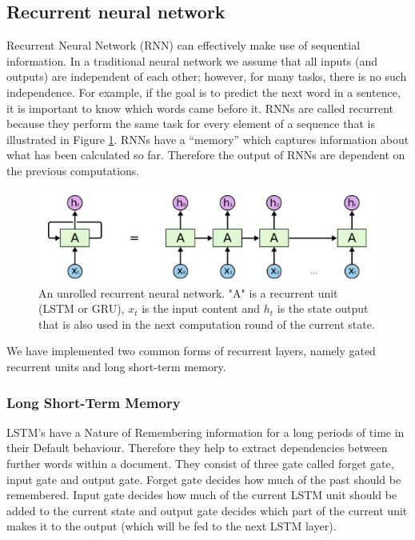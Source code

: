 \documentclass[8pt,conference,compsocconf]{IEEEtran}
\begin{document}
\subsection{Recurrent neural network}\label{sec:RNN}
Recurrent Neural Network (RNN) can effectively make use of sequential information. In a traditional neural network we assume that all inputs (and outputs) are independent of each other; however, for many tasks, there is no such independence. For example, if the goal is to predict the next word in a sentence, it is important to know which words came before it. RNNs are called recurrent because they perform the same task for every element of a sequence that is illustrated in Figure \ref{fig:rnn}. RNNs have a “memory” which captures information about what has been calculated so far. Therefore the output of RNNs are dependent on the previous computations.
	\begin{figure}[t]
	\centering
	\includegraphics[width=0.9 \linewidth]{fig/rnn.png}
	\caption{An unrolled recurrent neural network. "A" is a recurrent unit (LSTM or GRU), $x_t$ is the input content and $h_t$ is the state output that is also used in the next computation round of the current state.}
	\label{fig:rnn}
\end{figure}

We have implemented two common forms of recurrent layers, namely gated recurrent units and long short-term memory.
\subsubsection{Long Short-Term Memory}
LSTM’s have a Nature of Remembering information for a long periods of time in their Default behaviour. Therefore they help to extract dependencies between further words within a document. They consist of three gate called forget gate, input gate and output gate. Forget gate decides how much of the past should be remembered. Input gate decides how much of the current LSTM unit should be added to the current state and output gate decides which part of the current unit makes it to the output (which will be fed to the next LSTM layer). 
\end{document}
